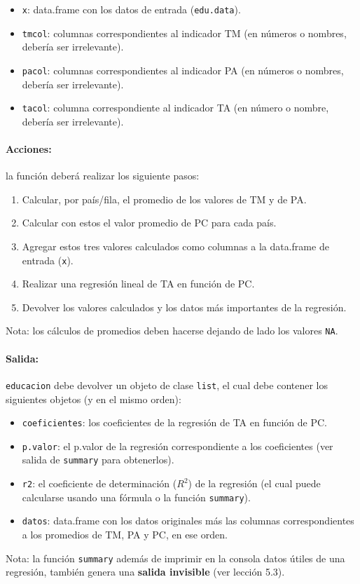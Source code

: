 \documentclass{article}
\begin{document}
\begin{itemize}
\item
  \verb!x!: data.frame con los datos de entrada (\verb!edu.data!).
\item
  \verb!tmcol!: columnas correspondientes al indicador TM (en números o
  nombres, debería ser irrelevante).
\item
  \verb!pacol!: columnas correspondientes al indicador PA (en números o
  nombres, debería ser irrelevante).
\item
  \verb!tacol!: columna correspondiente al indicador TA (en número o
  nombre, debería ser irrelevante).
\end{itemize}
\paragraph{Acciones:}

la función deberá realizar los siguiente pasos:

\begin{enumerate}[1.]
\item
  Calcular, por país/fila, el promedio de los valores de TM y de PA.
\item
  Calcular con estos el valor promedio de PC para cada país.
\item
  Agregar estos tres valores calculados como columnas a la data.frame de
  entrada (\verb!x!).
\item
  Realizar una regresión lineal de TA en función de PC.
\item
  Devolver los valores calculados y los datos más importantes de la
  regresión.
\end{enumerate}
Nota: los cálculos de promedios deben hacerse dejando de lado los
valores \verb!NA!.

\paragraph{Salida:}

\verb!educacion! debe devolver un objeto de clase \verb!list!, el cual
debe contener los siguientes objetos (y en el mismo orden):

\begin{itemize}
\item
  \verb!coeficientes!: los coeficientes de la regresión de TA en función
  de PC.
\item
  \verb!p.valor!: el p.valor de la regresión correspondiente a los
  coeficientes (ver salida de \verb!summary! para obtenerlos).
\item
  \verb!r2!: el coeficiente de determinación ($R^2$) de la regresión (el
  cual puede calcularse usando una fórmula o la función \verb!summary!).
\item
  \verb!datos!: data.frame con los datos originales más las columnas
  correspondientes a los promedios de TM, PA y PC, en ese orden.
\end{itemize}
Nota: la función \verb!summary! además de imprimir en la consola datos
útiles de una regresión, también genera una \textbf{salida invisible}
(ver lección 5.3).
\end{document}
